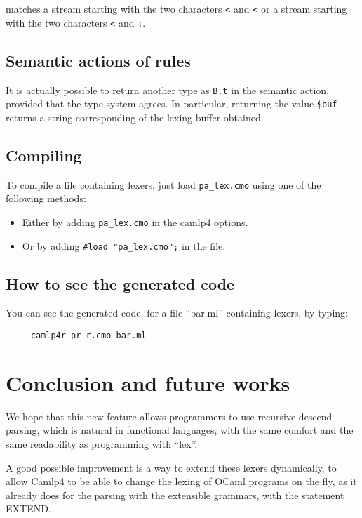\documentclass[11pt]{article}
\begin{document}
matches a stream starting with the two characters \verb/</ and
\verb/</ or a stream starting with the two characters \verb/</ and
\verb/:/.

\subsection{Semantic actions of rules}

It is actually possible to return another type as \verb/B.t/ in the
semantic action, provided that the type system agrees. In particular,
returning the value \verb/$buf/ returns a string corresponding of the
lexing buffer obtained.

\subsection{Compiling}

To compile a file containing lexers, just load \verb/pa_lex.cmo/ using
one of the following methods:

\begin{itemize}

\item Either by adding \verb/pa_lex.cmo/ in the camlp4 options.
\item Or by adding \verb/#load "pa_lex.cmo";/ in the file.

\end{itemize}

\subsection{How to see the generated code}

You can see the generated code, for a file ``bar.ml'' containing lexers, by
typing:

\begin{verbatim}
     camlp4r pr_r.cmo bar.ml
\end{verbatim}

\section{Conclusion and future works}

We hope that this new feature allows programmers to use recursive
descend parsing, which is natural in functional languages, with the
same comfort and the same readability as programming with ``lex''.

A good possible improvement is a way to extend these lexers
dynamically, to allow Camlp4 to be able to change the lexing of OCaml
programs on the fly, as it already does for the parsing with the
extensible grammars, with the statement EXTEND.
\end{document}
